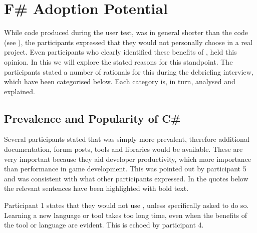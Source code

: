 \section{F\# Adoption Potential}
While \fs code produced during the user test, was in general shorter than the \cs code (see ), the participants expressed that they would not personally choose \fs in a real project. Even participants who clearly identified these benefits of \fs, held this opinion. In this we will explore the stated reasons for this standpoint. The participants stated a number of rationals for this during the debriefing interview, which have been categorised below. Each category is, in turn, analysed and explained.

\subsection{Prevalence and Popularity of C\#}
Several participants stated that \cs was simply more prevalent, therefore additional documentation, forum posts, tools and libraries would be available. These are very important because they aid developer productivity, which more importance than performance in game development. This was pointed out by participant 5 and was consistent with what other participants expressed. In the quotes below the relevant sentences have been highlighted with bold text.


Participant 1 states that they would not use \fs, unless specifically asked to do so. Learning a new language or tool takes too long time, even when the benefits of the tool or language are evident. This is echoed by participant 4.


